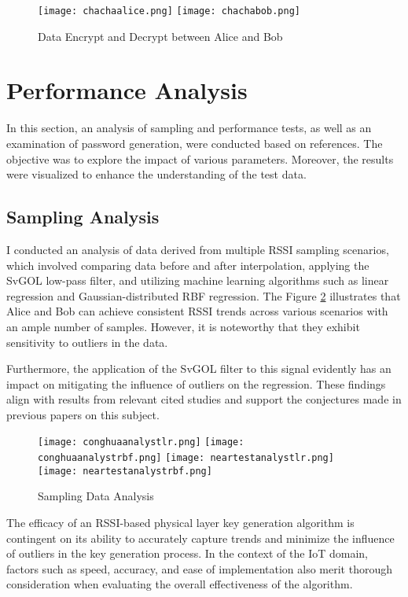 \begin{figure}
  \centering
  {\texttt{[image: chachaalice.png]}}
  {\texttt{[image: chachabob.png]}}
  \caption{Data Encrypt and Decrypt between Alice and Bob}\label{Data Encrypt and Decrypt}
\end{figure}

\section{Performance Analysis}
In this section, an analysis of sampling and performance tests, as well as an examination of password generation, were conducted based on references. The objective was to explore the impact of various parameters. Moreover, the results were visualized to enhance the understanding of the test data.

\subsection{Sampling Analysis}
I conducted an analysis of data derived from multiple RSSI sampling scenarios, which involved comparing data before and after interpolation, applying the SvGOL low-pass filter, and utilizing machine learning algorithms such as linear regression and Gaussian-distributed RBF regression. The Figure \ref{Sampling Data Analysis} illustrates that Alice and Bob can achieve consistent RSSI trends across various scenarios with an ample number of samples. However, it is noteworthy that they exhibit sensitivity to outliers in the data.

Furthermore, the application of the SvGOL filter to this signal evidently has an impact on mitigating the influence of outliers on the regression. These findings align with results from relevant cited studies and support the conjectures made in previous papers on this subject.
\begin{figure}
  \centering
  {\texttt{[image: conghuaanalystlr.png]}}
  {\texttt{[image: conghuaanalystrbf.png]}}
  {\texttt{[image: neartestanalystlr.png]}}
  {\texttt{[image: neartestanalystrbf.png]}}
  \caption{Sampling Data Analysis}\label{Sampling Data Analysis}
\end{figure}
The efficacy of an RSSI-based physical layer key generation algorithm is contingent on its ability to accurately capture trends and minimize the influence of outliers in the key generation process. In the context of the IoT domain, factors such as speed, accuracy, and ease of implementation also merit thorough consideration when evaluating the overall effectiveness of the algorithm.

